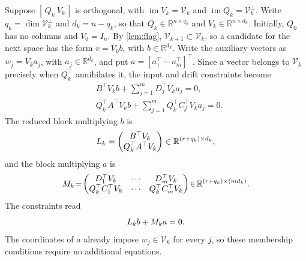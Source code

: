 \documentclass[twocolumn]{autart}
\begin{document}
Suppose $[\,Q_k\ V_k\,]$ is orthogonal, with
$\operatorname{im}V_k=\mathcal V_k$ and
$\operatorname{im}Q_k=\mathcal V_k^\perp$. Write
$q_k=\dim\mathcal V_k^\perp$ and $d_k=n-q_k$, so that
$Q_k\in\mathbb R^{n\times q_k}$ and $V_k\in\mathbb R^{n\times d_k}$.
Initially, $Q_0$ has no columns and $V_0=I_n$. By \cref{lem:flag},
$\mathcal V_{k+1}\subset\mathcal V_k$, so a candidate for the next space
has the form $v=V_kb$, with $b\in\mathbb R^{d_k}$. Write the auxiliary
vectors as $w_j=V_ka_j$, with $a_j\in\mathbb R^{d_k}$, and put
$a=[a_1^\top\ \cdots\ a_m^\top]^\top$. Since a vector belongs to
$\mathcal V_k$ precisely when $Q_k^\top$ annihilates it, the input and
drift constraints become\vspace{-3mm}
\begin{align*}
& B^\top V_kb+\sum_{j=1}^mD_j^\top V_ka_j =0,\\
& Q_k^\top A^\top V_kb+\sum_{j=1}^mQ_k^\top C_j^\top V_ka_j =0.
\end{align*}
The reduced block multiplying $b$ is\vspace{-2mm}
\begin{equation}\label{eq:reduced-blocks}
L_k=
\begin{pmatrix}
B^\top V_k\\
Q_k^\top A^\top V_k
\end{pmatrix}
\in\mathbb R^{(r+q_k)\times d_k},\vspace{-2mm}
\end{equation}
and the block multiplying $a$ is\vspace{-2mm}
\begin{equation}\label{eq:elimination-block}
M_k\!=\!
\begin{pmatrix}
D_1^\top V_k&\cdots&D_m^\top V_k\\
Q_k^\top C_1^\top V_k&\cdots&Q_k^\top C_m^\top V_k
\end{pmatrix}
\!\in\!\mathbb R^{(r+q_k)\times(md_k)}.\vspace{-2mm}
\end{equation}
The constraints read\vspace{-3mm}
\begin{equation}\label{eq:reduced-constraint}
L_kb+M_ka=0.\vspace{-2mm}
\end{equation}
The coordinates of $a$ already impose $w_j\in\mathcal V_k$ for every
$j$, so these membership conditions require no additional equations.
\end{document}
